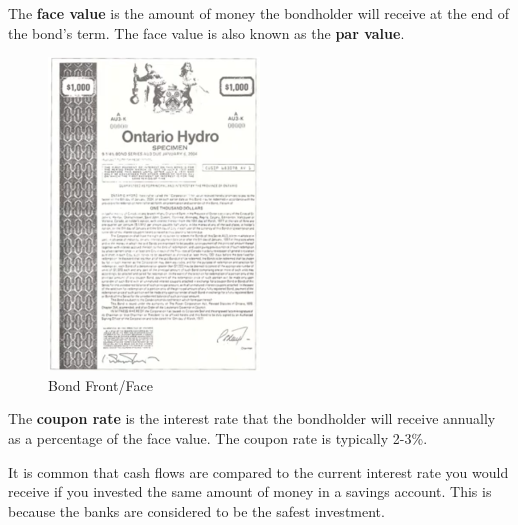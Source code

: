 \begin{definition}
    The \textbf{face value} is the amount of money the bondholder will receive at the end of the bond's term. The face value is also known as the \textbf{par value}.
\end{definition}

\begin{figure}[H]
    \centering
    \includegraphics[width=0.5\textwidth]{LECTURE_3/bond-face.png}
    \caption{Bond Front/Face}
\end{figure}

\begin{definition}
    The \textbf{coupon rate} is the interest rate that the bondholder will receive annually as a percentage of the face value. The coupon rate is typically 2-3\%.
\end{definition}

\begin{theorem}
    It is common that cash flows are compared to the current interest rate you would receive if you invested the same amount of money in a savings account. This is because the banks are considered to be the safest investment.
\end{theorem}

